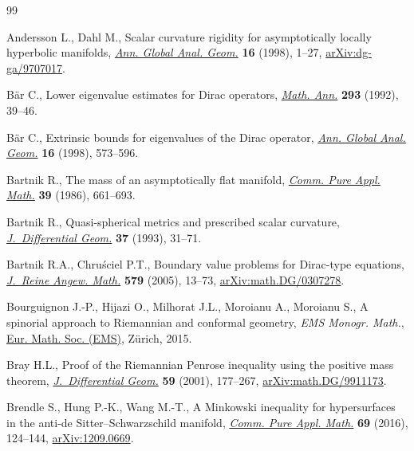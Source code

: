 \documentclass[10pt,a4paper]{amsart}
\numberwithin{equation}{section}
\begin{document}

\begin{thebibliography}{99}
\footnotesize\itemsep=0pt

Andersson L., Dahl M., Scalar curvature rigidity for asymptotically locally
 hyperbolic manifolds, \href{https://doi.org/10.1023/A:1006547905892}{\textit{Ann. Global Anal. Geom.}} \textbf{16} (1998),
 1--27, \href{https://arxiv.org/abs/dg-ga/9707017}{arXiv:dg-ga/9707017}.

B\"ar C., Lower eigenvalue estimates for {D}irac operators, \href{https://doi.org/10.1007/BF01444701}{\textit{Math. Ann.}}
 \textbf{293} (1992), 39--46.

B\"ar C., Extrinsic bounds for eigenvalues of the {D}irac operator,
 \href{https://doi.org/10.1023/A:1006550532236}{\textit{Ann. Global Anal. Geom.}} \textbf{16} (1998), 573--596.

Bartnik R., The mass of an asymptotically flat manifold, \href{https://doi.org/10.1002/cpa.3160390505}{\textit{Comm. Pure
 Appl. Math.}} \textbf{39} (1986), 661--693.

Bartnik R., Quasi-spherical metrics and prescribed scalar curvature,
 \href{https://doi.org/10.4310/jdg/1214453422}{\textit{J.~Differential Geom.}} \textbf{37} (1993), 31--71.

Bartnik R.A., Chru\'sciel P.T., Boundary value problems for {D}irac-type
 equations, \href{https://doi.org/10.1515/crll.2005.2005.579.13}{\textit{J.~Reine Angew. Math.}} \textbf{579} (2005), 13--73,
 \href{https://arxiv.org/abs/math.DG/0307278}{arXiv:math.DG/0307278}.

Bourguignon J.-P., Hijazi O., Milhorat J.L., Moroianu A., Moroianu S., A
 spinorial approach to {R}iemannian and conformal geometry, \textit{EMS Monogr. Math.},
 \href{https://doi.org/10.4171/136}{Eur. Math. Soc. (EMS)}, Z\"urich, 2015.

Bray H.L., Proof of the {R}iemannian {P}enrose inequality using the positive
 mass theorem, \href{https://doi.org/10.4310/jdg/1090349428}{\textit{J.~Differential Geom.}} \textbf{59} (2001), 177--267,
 \href{https://arxiv.org/abs/math.DG/9911173}{arXiv:math.DG/9911173}.

Brendle S., Hung P.-K., Wang M.-T., A {M}inkowski inequality for hypersurfaces in
 the anti-de {S}itter--{S}chwarzschild manifold, \href{https://doi.org/10.1002/cpa.21556}{\textit{Comm. Pure Appl.
 Math.}} \textbf{69} (2016), 124--144, \href{https://arxiv.org/abs/1209.0669}{arXiv:1209.0669}.


\end{thebibliography}
\end{document}
